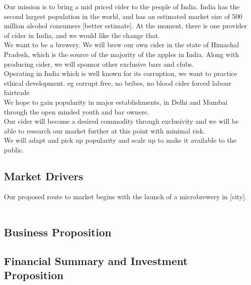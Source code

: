 \documentclass[11pt]{article}
\begin{document}
Our mission is to bring a mid priced cider to the people of India. India has the second largest population in the world, and has an estimated market size of 500 million alcohol consumers [better estimate]. At the moment, there is one provider of cider in India, and we would like the change that. \\

\noindent We want to be a brewery. We will brew our own cider in the state of Himachal Pradesh, which is the source of the majority of the apples in India. Along with producing cider, we will sponsor other exclusive bars and clubs. \\

\noindent Operating in India which is well known for its corruption, we want to practice ethical development. eg corrupt free, no bribes, no blood cider forced labour fairtrade \\

\noindent We hope to gain popularity in major establishments, in Delhi and Mumbai through the open minded youth and bar owners. \\

\noindent Our cider will become a desired commodity through exclusivity and we will be able to research our market further at this point with minimal risk. \\

\noindent We will adapt and pick up popularity and scale up to make it available to the public.

  \subsection{Market Drivers}
\noindent Our proposed route to market begins with the launch of a microbrewery in [city]. \\

 \\

  \subsection{Business Proposition}
  \subsection{Financial Summary and Investment Proposition}
\end{document}
